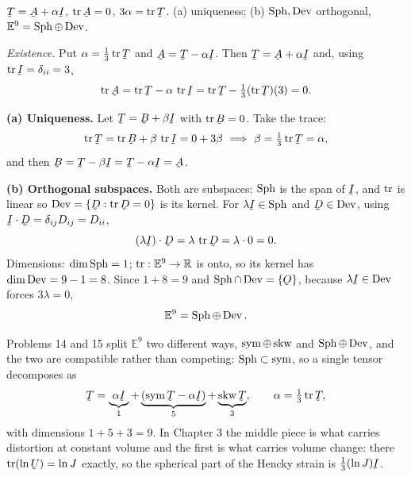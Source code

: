 \begin{problem}
$\bT=\bA+\alpha\I$, $\tr\bA=0$, $3\alpha=\tr\bT$. (a) uniqueness; (b)
$\operatorname{Sph},\operatorname{Dev}$ orthogonal, $\mathbb{E}^9=\operatorname{Sph}\oplus\operatorname{Dev}$.
\end{problem}
\begin{solution}
\emph{Existence.} Put $\alpha=\tfrac13\tr\bT$ and $\bA=\bT-\alpha\I$.
Then $\bT=\bA+\alpha\I$ and, using $\tr\I=\dd_{ii}=3$,
\[
   \tr\bA=\tr\bT-\alpha\,\tr\I=\tr\bT-\tfrac13(\tr\bT)(3)=0 .
\]

\textbf{(a) Uniqueness.} Let $\bT=\bB+\beta\I$ with $\tr\bB=0$. Take the
trace:
\[
   \tr\bT=\tr\bB+\beta\,\tr\I=0+3\beta
   \ \Longrightarrow\ \beta=\tfrac13\tr\bT=\alpha ,
\]
and then $\bB=\bT-\beta\I=\bT-\alpha\I=\bA$.

\textbf{(b) Orthogonal subspaces.} Both are subspaces: $\operatorname{Sph}$ is the span
of $\I$, and $\operatorname{tr}$ is linear so $\Dev=\{\bD:\tr\bD=0\}$ is its kernel.
For $\lambda\I\in\Sph$ and $\bD\in\Dev$, using
$\I\cdot\bD=\dd_{ij}D_{ij}=D_{ii}$,
\[
   (\lambda\I)\cdot\bD=\lambda\,\tr\bD=\lambda\cdot0=0 .
\]
Dimensions: $\dim\operatorname{Sph}=1$; $\operatorname{tr}:\mathbb{E}^{9}\to\mathbb{R}$ is onto, so its
kernel has $\dim\operatorname{Dev}=9-1=8$. Since $1+8=9$ and
$\Sph\cap\Dev=\{\Ob\}$, because $\lambda\I\in\Dev$ forces
$3\lambda=0$,
\[
   \mathbb{E}^{9}=\operatorname{Sph}\oplus\operatorname{Dev} .
\]
\end{solution}

\begin{remark}\label{rem:twosplits}
Problems 14 and 15 split $\mathbb{E}^{9}$ two different ways,
$\operatorname{sym}\oplus\operatorname{skw}$ and $\operatorname{Sph}\oplus\operatorname{Dev}$, and the two are compatible rather
than competing: $\operatorname{Sph}\subset\operatorname{sym}$, so a single tensor decomposes as
\[
   \bT=\underbrace{\alpha\I}_{1}
      +\underbrace{(\Sym\bT-\alpha\I)}_{5}
      +\underbrace{\Skw\bT}_{3},
   \qquad \alpha=\tfrac13\tr\bT,
\]
with dimensions $1+5+3=9$. In Chapter 3 the middle piece is what carries
distortion at constant volume and the first is what carries volume change:
there $\tr(\ln\vek{U})=\ln J$ exactly, so the spherical part of the Hencky
strain is $\tfrac13(\ln J)\I$.
\end{remark}

